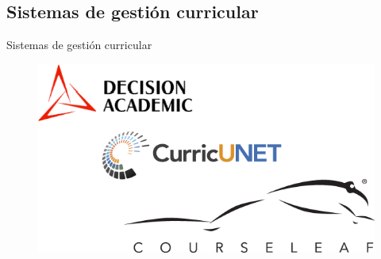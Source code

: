 \documentclass[10pt,xcolor=table ]{beamer}
\begin{document}
\subsection{Sistemas de gestión curricular}
\begin{frame}{Sistemas de gestión curricular}
	\begin{figure}
		\centering
	    \includegraphics[scale=0.5]{../Figuras/cms_alternatives}
	\end{figure}
\end{frame}
\end{document}
